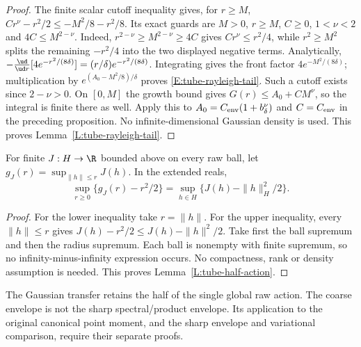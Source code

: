\begin{proof}
  The finite scalar cutoff inequality gives, for $r\ge M$,
  $Cr^\nu-r^2/2\le-M^2/8-r^2/8$.
  Its exact guards are $M>0$, $r\ge M$, $C\ge0$,
  $1<\nu<2$ and $4C\le M^{2-\nu}$.
  Indeed, $r^{2-\nu}\ge M^{2-\nu}\ge4C$ gives
  $Cr^\nu\le r^2/4$, while $r^2\ge M^2$ splits the
  remaining $-r^2/4$ into the two displayed negative terms.
  Analytically,
  $-\frac{\ud}{\ud r}[4e^{-r^2/(8\delta)}]
  =(r/\delta)e^{-r^2/(8\delta)}$.
  Integrating gives the front factor $4e^{-M^2/(8\delta)}$;
  multiplication by $e^{(A_0-M^2/8)/\delta}$ proves
  \eqref{E:tube-rayleigh-tail}.
  Such a cutoff exists since $2-\nu>0$.
  On $[0,M]$ the growth bound gives $G(r)\le A_0+CM^\nu$,
  so the integral is finite there as well.
  Apply this to $A_0=C_{\rm env}(1+b_\delta^\nu)$ and
  $C=C_{\rm env}$ in the preceding proposition.
  No infinite-dimensional Gaussian density is used.
  This proves Lemma~\ref{L:tube-rayleigh-tail}.
\end{proof}

\begin{lemma}\label{L:tube-half-action}
  For finite $J:H\to\R$ bounded above on every raw ball,
  let $g_J(r)=\sup_{\|h\|\le r}J(h)$. In the extended reals,
  \[
    \sup_{r\ge0}\{g_J(r)-r^2/2\}
    =\sup_{h\in H}\{J(h)-\|h\|_H^2/2\}.
  \]
\end{lemma}

\begin{proof}
  For the lower inequality take $r=\|h\|$.
  For the upper inequality, every $\|h\|\le r$ gives
  $J(h)-r^2/2\le J(h)-\|h\|^2/2$.
  Take first the ball supremum and then the radius supremum.
  Each ball is nonempty with finite supremum, so no
  infinity-minus-infinity expression occurs.
  No compactness, rank or density assumption is needed.
  This proves Lemma~\ref{L:tube-half-action}.
\end{proof}

The Gaussian transfer retains the half of the single global raw action.
The coarse envelope is not the sharp spectral/product envelope.
Its application to the original canonical point moment, and the sharp
envelope and variational comparison, require their separate proofs.
